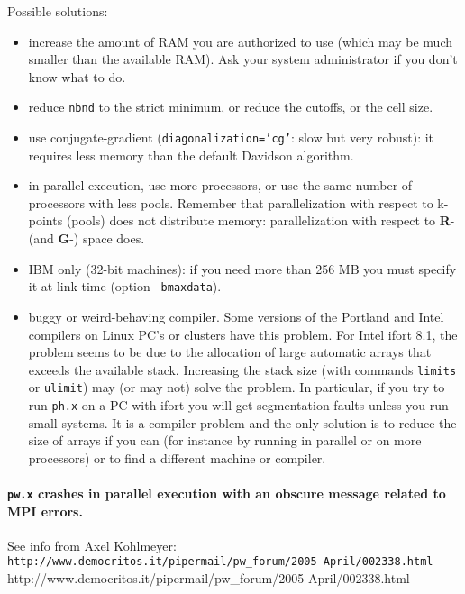 \documentclass[12pt,a4paper]{article}
\begin{document}
Possible solutions:
\begin{itemize}
  \item
    increase the amount of RAM you are authorized to use (which may be
    much smaller than the available RAM).
    Ask your system administrator if you don't know what to do.
  \item
    reduce \texttt{nbnd} to the strict minimum, or reduce the cutoffs,
    or the cell size.
  \item
    use conjugate-gradient (\texttt{diagonalization='cg'}: slow 
    but very robust): it requires less memory than the default 
    Davidson algorithm.
  \item
    in parallel execution, use more processors, or use the same number
    of processors with less pools.
    Remember that parallelization with respect to k-points (pools)
    does not distribute memory: parallelization with respect to
    \textbf{R}- (and \textbf{G}-) space does.
  \item
    IBM only (32-bit machines): if you need more than 256 MB you must
    specify it at link time (option \texttt{-bmaxdata}).
  \item
    buggy or weird-behaving compiler.
    Some versions of the Portland and Intel compilers on Linux PC's 
    or clusters have this problem. For Intel ifort 8.1, the problem
    seems to be due to the allocation of large automatic arrays
    that exceeds the available stack. Increasing the stack size 
    (with commands \texttt{limits} or \texttt{ulimit}) may (or may
    not) solve the problem. In particular, if you try to run \texttt{ph.x} 
    on a PC with ifort you will get segmentation faults unless you run
    small systems.
    It is a compiler problem and the only solution is to reduce the
    size of arrays if you can (for instance by running in parallel 
    or on more processors) or to find a different machine or compiler.
\end{itemize}

\paragraph{\texttt{pw.x} crashes in parallel execution with an obscure
            message related to MPI errors.}

See info from Axel Kohlmeyer:\hfill\break
\htmladdnormallink%
{{\small\texttt{http://www.democritos.it/pipermail/pw\_forum/2005-April/002338.html}}}%
{http://www.democritos.it/pipermail/pw_forum/2005-April/002338.html}
\end{document}
